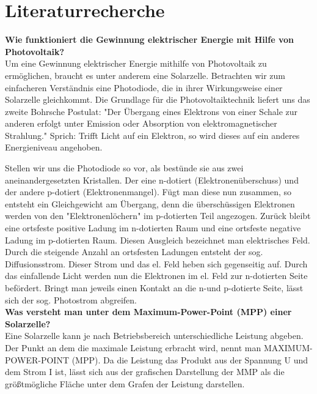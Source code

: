 \section{Literaturrecherche}
\textbf{Wie funktioniert die Gewinnung elektrischer Energie mit Hilfe von Photovoltaik?\\}
Um eine Gewinnung elektrischer Energie mithilfe von Photovoltaik zu ermöglichen, braucht es unter anderem eine Solarzelle. Betrachten wir zum einfacheren Verständnis eine Photodiode, die in ihrer Wirkungsweise einer Solarzelle gleichkommt. 
Die Grundlage für die Photovoltaiktechnik liefert uns das zweite Bohrsche Postulat: "Der Übergang eines Elektrons von einer Schale zur anderen erfolgt unter Emission oder Absorption von elektromagnetischer Strahlung." Sprich: Trifft Licht auf ein Elektron, so wird dieses auf ein anderes Energieniveau angehoben. 

Stellen wir uns die Photodiode so vor, als bestünde sie aus zwei aneinandergesetzten Kristallen. Der eine n-dotiert (Elektronenüberschuss) und der andere p-dotiert (Elektronenmangel). Fügt man diese nun zusammen, so entsteht ein Gleichgewicht am Übergang, denn die überschüssigen Elektronen werden von den "Elektronenlöchern" im p-dotierten Teil angezogen. Zurück bleibt eine ortsfeste positive Ladung im n-dotierten Raum und eine ortsfeste negative Ladung im p-dotierten Raum. Diesen Ausgleich bezeichnet man elektrisches Feld. Durch die steigende Anzahl an ortsfesten Ladungen entsteht der sog. Diffusionsstrom. Dieser Strom und das el. Feld heben sich gegenseitig auf.
Durch das einfallende Licht werden nun die Elektronen im el. Feld zur n-dotierten Seite befördert. Bringt man jeweils einen Kontakt an die n-und p-dotierte Seite, lässt sich der sog. Photostrom abgreifen.\\
 
\textbf{Was versteht man unter dem Maximum-Power-Point (MPP) einer Solarzelle?\\}
Eine Solarzelle kann je nach Betriebsbereich unterschiedliche Leistung abgeben. Der Punkt an dem die maximale Leistung erbracht wird, nennt man MAXIMUM-POWER-POINT (MPP). Da die Leistung das Produkt aus der Spannung U und dem Strom I ist, lässt sich aus der grafischen Darstellung der MMP als die größtmögliche Fläche unter dem Grafen der Leistung darstellen.\\

